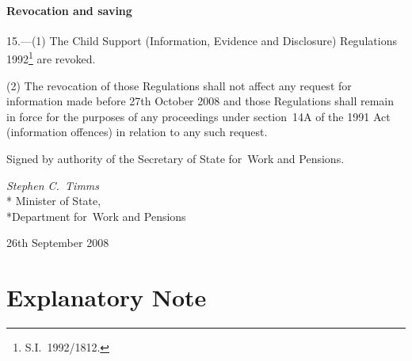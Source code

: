 \documentclass[12pt,a4paper]{article}
\begin{document}
\renewcommand\parthead{--- Part~IV}

\subsection[15. Revocation and saving]{Revocation and saving}

15.---(1)  The Child Support (Information, Evidence and Disclosure) Regulations 1992\footnote{S.I.~1992/1812.} are revoked.

(2) The revocation of those Regulations shall not affect any request for information made before 27th October 2008 and those Regulations shall remain in force for the purposes of any proceedings under section~14A of the 1991 Act (information offences) in relation to any such request.


%

\bigskip

Signed 
by authority of the 
Secretary of State for~Work and Pensions.

{\raggedleft
\emph{Stephen C.~Timms}\\*
Minister
of State,\\*Department for~Work and Pensions

}

26th September 2008

\small

\part{Explanatory Note}
\end{document}

